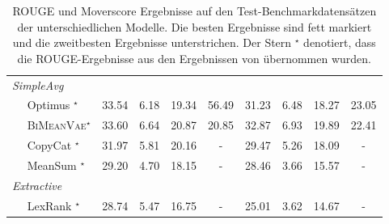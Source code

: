 \begin{table}[!h]
\begin{tabular}{@{}lcccc|cccc@{}}
    
    

    \textit{SimpleAvg}                   &       &      &       &       &       &      &       & \\
    $\quad$ Optimus  $^{\star}$          & 33.54 & 6.18 & 19.34 & 56.49 & 31.23 & 6.48 & 18.27 & 23.05\\
    $\quad$ \textsc{BiMeanVae}$^{\star}$ & 33.60 & 6.64 & 20.87 & 20.85 & 32.87 & 6.93 & 19.89 & 22.41\\
    $\quad$ CopyCat  $^{\star}$          & 31.97 & 5.81 & 20.16 & -     & 29.47 & 5.26 & 18.09 & -\\ 
    $\quad$ MeanSum  $^{\star}$          & 29.20 & 4.70 & 18.15 & -     & 28.46 & 3.66 & 15.57 & -\\ \midrule
    \textit{Extractive}                  &       &      &       &       &       &      &       &      \\
    $\quad$ LexRank  $^{\star}$          & 28.74 & 5.47 & 16.75 & -     & 25.01 & 3.62 & 14.67 & -\\ \bottomrule
    \end{tabular}
    \caption{ROUGE und Moverscore Ergebnisse auf den Test-Benchmarkdatensätzen der unterschiedlichen Modelle. Die besten Ergebnisse sind fett markiert und die zweitbesten Ergebnisse unterstrichen.
    Der Stern $^{\star}$ denotiert, dass die ROUGE-Ergebnisse aus den Ergebnissen von \citep{coop} übernommen wurden.
    }
    \label{eval_results}
\end{table}

